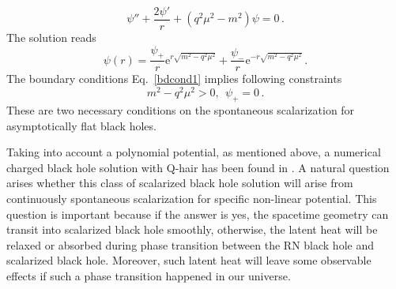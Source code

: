 \documentclass[pr, twocolumn, preprintnumbers, showpacs,footnoteadded, superscriptaddress,nofootinbib,longbibliography]{revtex4-1}
\newcommand{\te}{\mathrm{e}}
\begin{document}
%
\begin{equation}\label{eqscalar2}
  \psi''+\frac{2\psi'}r+(q^2\mu^2-m^2)\psi=0\, .
\end{equation}
%
The solution reads
%
\begin{equation}\label{asysol1}
  \psi(r)=\frac{\psi_+}{r}\te^{r\sqrt{m^2-q^2\mu^2}}+\frac{\psi_-}r\te^{-r\sqrt{m^2-q^2\mu^2}}\,.
\end{equation}
%
The boundary conditions Eq.~\eqref{bdcond1} implies following constraints
%
\begin{equation}\label{constraint1}
  m^2-q^2\mu^2>0,~~\psi_+=0\,.
\end{equation}
%
These are two necessary conditions on the spontaneous scalarization for asymptotically flat black holes.

Taking into account a polynomial potential, as mentioned above, a numerical charged black hole solution with Q-hair has been found in \cite{Mayo:1996mv, Hong:2020miv}. A natural question arises whether this class of scalarized black hole solution will arise from continuously spontaneous scalarization for specific non-linear potential. This question is important because if the answer is yes, the spacetime geometry can transit into scalarized black hole smoothly, otherwise, the latent heat will be relaxed or absorbed during phase transition between the RN black hole and scalarized black hole. Moreover, such latent heat will leave some observable effects if such a phase transition happened in our universe.
\end{document}
